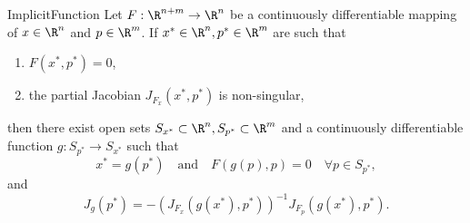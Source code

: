 \begin{theo}{ImplicitFunction}
    Let $F: \R^{n+m} \rightarrow \R^n$ be a continuously differentiable mapping of $x \in \R^n$ and $p \in \R^m$. If $x^* \in \R^n, p^* \in \R^m$ are such that 
    \begin{enumerate}
        \item $F(x^*, p^*) = 0$,
        \item the partial Jacobian $J_{F_x}(x^*, p^*)$ is non-singular,
    \end{enumerate}
    then there exist open sets $S_{x^*} \subset \R^n, S_{p^*} \subset \R^m$ and a continuously differentiable function $g: S_{p^*} \rightarrow S_{x^*}$ such that 
    \begin{equation*}
        x^* = g(p^*) \quad \text{and} \quad F(g(p), p) = 0 \quad \forall p \in S_{p^*},
    \end{equation*}
    and 
    \begin{equation*}
        J_g(p^*) = -{(J_{F_x}(g(x^*), p^*))}^{-1} J_{F_p}(g(x^*), p^*).
    \end{equation*}
    \vspace*{-0.5cm}
\end{theo}
